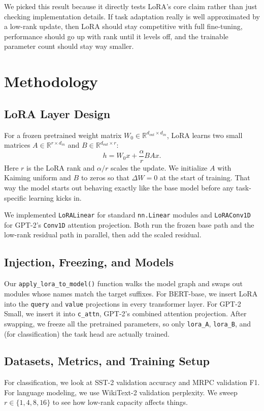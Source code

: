 \documentclass[11pt,twocolumn]{article}
\begin{document}
We picked this result because it directly tests LoRA's core claim rather than just checking implementation details. If task adaptation really is well approximated by a low-rank update, then LoRA should stay competitive with full fine-tuning, performance should go up with rank until it levels off, and the trainable parameter count should stay way smaller.

\section{Methodology}
\subsection{LoRA Layer Design}
For a frozen pretrained weight matrix $W_0\in\mathbb{R}^{d_{out}\times d_{in}}$, LoRA learns two small matrices $A\in\mathbb{R}^{r\times d_{in}}$ and $B\in\mathbb{R}^{d_{out}\times r}$:
\begin{equation}
  h = W_0x + \frac{\alpha}{r}BAx.
  \label{eq:lora}
\end{equation}
Here $r$ is the LoRA rank and $\alpha/r$ scales the update. We initialize $A$ with Kaiming uniform and $B$ to zeros so that $\Delta W=0$ at the start of training. That way the model starts out behaving exactly like the base model before any task-specific learning kicks in.

We implemented \texttt{LoRALinear} for standard \texttt{nn.Linear} modules and \texttt{LoRAConv1D} for GPT-2's \texttt{Conv1D} attention projection. Both run the frozen base path and the low-rank residual path in parallel, then add the scaled residual.

\subsection{Injection, Freezing, and Models}
Our \texttt{apply\_lora\_to\_model()} function walks the model graph and swaps out modules whose names match the target suffixes. For BERT-base, we insert LoRA into the \texttt{query} and \texttt{value} projections in every transformer layer. For GPT-2 Small, we insert it into \texttt{c\_attn}, GPT-2's combined attention projection. After swapping, we freeze all the pretrained parameters, so only \texttt{lora\_A}, \texttt{lora\_B}, and (for classification) the task head are actually trained.

\subsection{Datasets, Metrics, and Training Setup}
For classification, we look at SST-2 validation accuracy and MRPC validation F1. For language modeling, we use WikiText-2 validation perplexity. We sweep $r\in\{1,4,8,16\}$ to see how low-rank capacity affects things.
\end{document}

